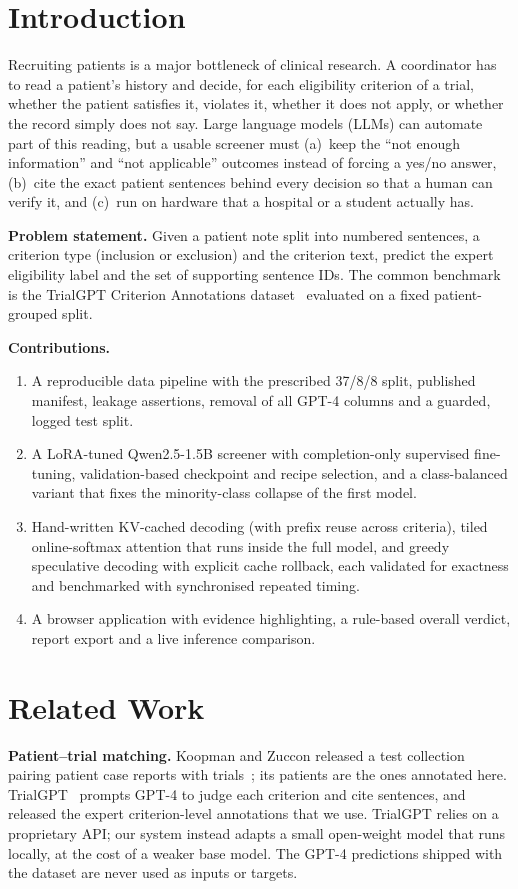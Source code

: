 \documentclass[conference]{IEEEtran}
\begin{document}
\section{Introduction}
Recruiting patients is a major bottleneck of clinical research. A coordinator has to read a patient's history and decide, for each eligibility criterion of a trial, whether the patient satisfies it, violates it, whether it does not apply, or whether the record simply does not say. Large language models (LLMs) can automate part of this reading, but a usable screener must (a)~keep the ``not enough information'' and ``not applicable'' outcomes instead of forcing a yes/no answer, (b)~cite the exact patient sentences behind every decision so that a human can verify it, and (c)~run on hardware that a hospital or a student actually has.

\textbf{Problem statement.} Given a patient note split into numbered sentences, a criterion type (inclusion or exclusion) and the criterion text, predict the expert eligibility label and the set of supporting sentence IDs. The common benchmark is the TrialGPT Criterion Annotations dataset~\cite{jin2024trialgpt} evaluated on a fixed patient-grouped split.

\textbf{Contributions.}
\begin{enumerate}
\item A reproducible data pipeline with the prescribed 37/8/8 split, published manifest, leakage assertions, removal of all GPT-4 columns and a guarded, logged test split.
\item A LoRA-tuned Qwen2.5-1.5B screener with completion-only supervised fine-tuning, validation-based checkpoint and recipe selection, and a class-balanced variant that fixes the minority-class collapse of the first model.
\item Hand-written KV-cached decoding (with prefix reuse across criteria), tiled online-softmax attention that runs inside the full model, and greedy speculative decoding with explicit cache rollback, each validated for exactness and benchmarked with synchronised repeated timing.
\item A browser application with evidence highlighting, a rule-based overall verdict, report export and a live inference comparison.
\end{enumerate}

\section{Related Work}
\textbf{Patient--trial matching.} Koopman and Zuccon released a test collection pairing patient case reports with trials~\cite{koopman2016test}; its patients are the ones annotated here. TrialGPT~\cite{jin2024trialgpt} prompts GPT-4 to judge each criterion and cite sentences, and released the expert criterion-level annotations that we use. TrialGPT relies on a proprietary API; our system instead adapts a small open-weight model that runs locally, at the cost of a weaker base model. The GPT-4 predictions shipped with the dataset are never used as inputs or targets.
\end{document}
